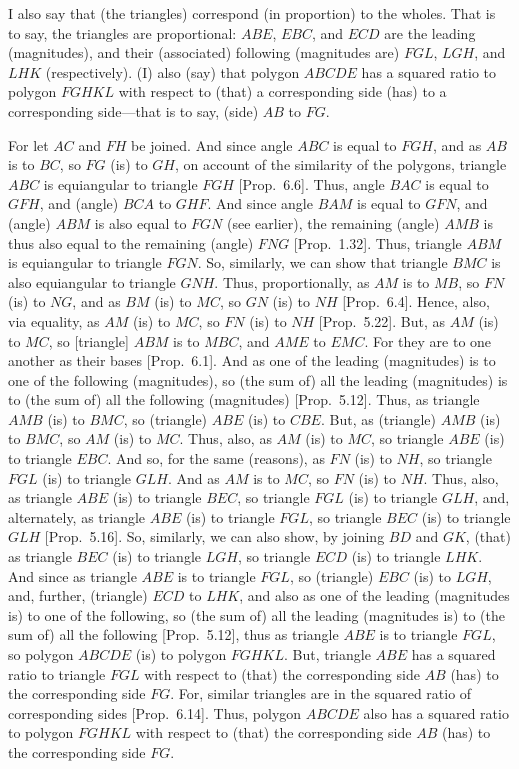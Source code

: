\begin{Parallel}{}{}
{I also say that (the triangles) correspond (in proportion) to the wholes.
That is to say,  the triangles are proportional:  $ABE$, $EBC$, and
$ECD$ are the leading (magnitudes), and their (associated) following (magnitudes are) 
$FGL$, $LGH$, and $LHK$ (respectively). (I) also (say) that polygon
$ABCDE$ has a squared ratio to polygon $FGHKL$ with respect to
(that) a corresponding side (has) to a corresponding side---that is to
say, (side) $AB$ to $FG$.

For let $AC$ and $FH$ be joined. And since angle $ABC$ is
equal to $FGH$,  and
as $AB$ is to $BC$, so $FG$ (is) to $GH$, on account of the similarity of the polygons,  triangle $ABC$ is equiangular to triangle
$FGH$ [Prop.~6.6]. Thus, angle $BAC$ is equal 
to $GFH$, and (angle) $BCA$ to $GHF$. And since angle $BAM$ is equal to 
$GFN$, and (angle) $ABM$ is also equal to $FGN$ (see earlier), the remaining (angle) $AMB$ is
thus also equal to the remaining (angle) $FNG$  [Prop.~1.32]. 
Thus, triangle $ABM$ is equiangular to triangle $FGN$. So, similarly, we can
show that triangle $BMC$ is also equiangular to triangle $GNH$. Thus, proportionally,
as $AM$ is to $MB$, so $FN$ (is) to $NG$, and as $BM$ (is) to $MC$, so $GN$ (is) to
$NH$ [Prop.~6.4]. Hence, also, via equality,
as $AM$ (is) to $MC$, so $FN$ (is) to $NH$ 
[Prop.~5.22]. But, as $AM$ (is) to $MC$,
so [triangle] $ABM$ is to $MBC$, and $AME$ to $EMC$. For they are to one another
 as their bases  [Prop.~6.1]. And as one
 of the leading (magnitudes) is to one of the following (magnitudes), so
    (the sum of) all the leading (magnitudes) is to (the sum of) all the following (magnitudes)
[Prop.~5.12]. Thus, as triangle $AMB$
 (is) to $BMC$, so (triangle) $ABE$ (is) to $CBE$. But, as (triangle) $AMB$ (is) to
 $BMC$, so $AM$ (is) to $MC$. Thus, also, as $AM$ (is) to $MC$, so 
triangle $ABE$
 (is) to triangle $EBC$. And so, for the same (reasons), as $FN$ (is) to $NH$,
 so triangle $FGL$  (is) to triangle $GLH$. And as $AM$ is to $MC$, so $FN$ (is) to
 $NH$. Thus, also, as triangle $ABE$ (is) to triangle $BEC$, so triangle $FGL$
 (is) to triangle $GLH$, and, alternately, as triangle $ABE$ (is) to triangle
 $FGL$, so triangle $BEC$ (is) to triangle $GLH$  [Prop.~5.16]. So, similarly, we can also show, by
 joining $BD$ and $GK$, (that)  as triangle $BEC$ (is) to triangle $LGH$,
 so triangle $ECD$ (is) to triangle $LHK$. And since as triangle $ABE$ is
 to triangle $FGL$, so (triangle) $EBC$ (is) to $LGH$, and, further, (triangle)
 $ECD$ to $LHK$, and also as one of the leading (magnitudes is) to one
 of the following, so (the sum of) all the leading (magnitudes is) to (the sum of) all the
 following [Prop.~5.12], thus as triangle
 $ABE$ is to triangle $FGL$, so polygon $ABCDE$ (is) to polygon
 $FGHKL$. But, triangle $ABE$ has a squared ratio to triangle $FGL$ with
 respect to (that) the corresponding side $AB$ (has) to the corresponding side
 $FG$. For, similar triangles are in the squared ratio of corresponding sides 
[Prop.~6.14]. Thus, polygon
$ABCDE$ also has a squared ratio to polygon $FGHKL$ with respect to
(that) the corresponding side $AB$ (has) to the corresponding side
$FG$.

}
\end{Parallel}
